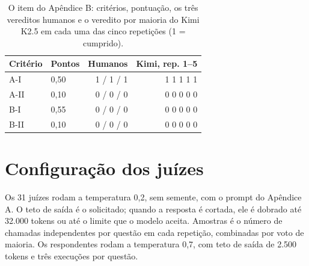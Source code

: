 \documentclass{IOS-Book-Article}
\begin{document}
\begin{table}[!ht]
\centering
\caption{O item do Apêndice B: critérios, pontuação, os três vereditos humanos e o veredito por maioria do Kimi K2.5 em cada uma das cinco repetições (1 = cumprido).}
\footnotesize\setlength{\tabcolsep}{2pt}
\begin{tabular}{llrr}
\hline
\textbf{Critério} & \textbf{Pontos} & \textbf{Humanos} & \textbf{Kimi, rep. 1--5} \\
\hline
A-I & 0,50 & 1 / 1 / 1 & 1 1 1 1 1 \\
A-II & 0,10 & 0 / 0 / 0 & 0 0 0 0 0 \\
B-I & 0,55 & 0 / 0 / 0 & 0 0 0 0 0 \\
B-II & 0,10 & 0 / 0 / 0 & 0 0 0 0 0 \\
\hline
\end{tabular}
\end{table}


\section{Configuração dos juízes}

Os 31 juízes rodam a temperatura 0,2, sem semente, com o prompt do Apêndice A. O teto de saída é o solicitado; quando a resposta é cortada, ele é dobrado até 32.000 tokens ou até o limite que o modelo aceita. Amostras é o número de chamadas independentes por questão em cada repetição, combinadas por voto de maioria. Os respondentes rodam a temperatura 0,7, com teto de saída de 2.500 tokens e três execuções por questão.
\end{document}
